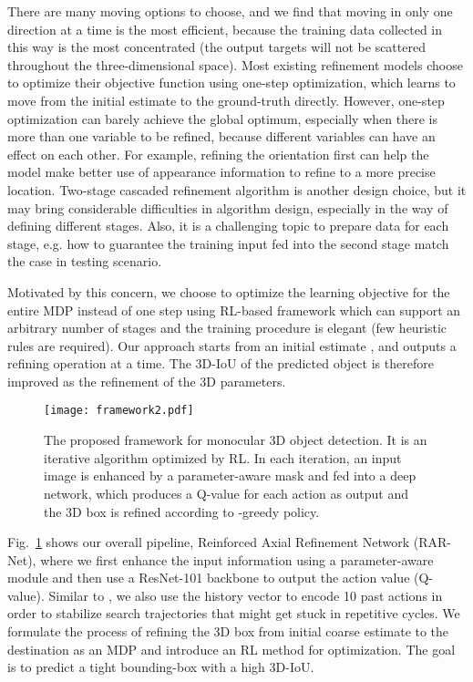 \documentclass[runningheads]{llncs}
\begin{document}
There are many moving options to choose, and we find that moving in only one direction at a time is the most efficient, because the training data collected in this way is the most concentrated (the output targets will not be scattered throughout the three-dimensional space). Most existing refinement models choose to optimize their objective function using one-step optimization, which learns to move from the initial estimate to the ground-truth directly. However, one-step optimization can barely achieve the global optimum, especially when there is more than one variable to be refined, because different variables can have an effect on each other. For example, refining the orientation first can help the model make better use of appearance information to refine to a more precise location. Two-stage cascaded refinement algorithm is another design choice, but it may bring considerable difficulties in algorithm design, especially in the way of defining different stages. Also, it is a challenging topic to prepare data for each stage, e.g. how to guarantee the training input fed into the second stage match the case in testing scenario.

Motivated by this concern, we choose to optimize the learning objective for the entire MDP instead of one step using RL-based framework which can support an arbitrary number of stages and the training procedure is elegant (few heuristic rules are required). Our approach starts from an initial estimate , and outputs a refining operation at a time. The 3D-IoU of the predicted object is therefore improved as the refinement of the 3D parameters.

\begin{figure}[t]
    \begin{center}
       \texttt{[image: framework2.pdf]}
    \end{center}
   \caption{The proposed framework for monocular 3D object detection. It is an iterative algorithm optimized by RL. In each iteration, an input image is enhanced by a parameter-aware mask and fed into a deep network, which produces a Q-value for each action as output and the 3D box is refined according to -greedy policy.}
\label{fig:framework}
\end{figure}

Fig.~\ref{fig:framework} shows our overall pipeline, Reinforced Axial Refinement Network (RAR-Net), where we first enhance the input information using a parameter-aware module and then use a ResNet-101 \cite{he2016deep} backbone to output the action value (Q-value). Similar to \cite{caicedo2015active}, we also use the history vector to encode 10 past actions in order to stabilize search trajectories that might get stuck in repetitive cycles. We formulate the process of refining the 3D box from initial coarse estimate to the destination as an MDP and introduce an RL method for optimization. The goal is to predict a tight bounding-box with a high 3D-IoU.
\end{document}
